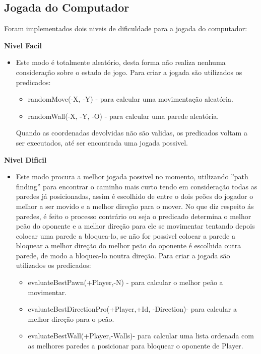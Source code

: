 \documentclass[a4paper]{article}
\begin{document}
\newpage
\subsection{Jogada do Computador} 

Foram implementados dois niveis de dificuldade para a jogada do computador:

\textbf{Nivel Facil}
\begin{itemize}
\item Este modo é totalmente aleatório, desta forma não realiza nenhuma consideração sobre o estado de jogo. Para criar a jogada são utilizados os predicados:
	\begin{itemize}
		\item randomMove(-X, -Y) - para calcular uma movimentação aleatória.
		\item randomWall(-X, -Y, -O) - para calcular uma parede aleatória.
	\end{itemize}
	 Quando as coordenadas devolvidas não são validas, os predicados voltam a ser executados, até ser encontrada uma jogada possivel.
\end{itemize}

\textbf{Nivel Dificil}
\begin{itemize}
\item Este modo procura a melhor jogada possivel no momento, utilizando ''path finding'' para encontrar o caminho mais curto tendo em consideração todas as paredes já posicionadas, assim é escolhido de entre o dois peões do jogador o melhor a ser movido e a melhor direção para o mover.
No que diz respeito ás paredes, é feito o processo contrário ou seja o predicado determina o melhor peão do oponente e a melhor direção para ele se movimentar tentando depois colocar uma parede a bloquea-lo, se não for possivel colocar a parede a bloquear a melhor direção do melhor peão do oponente é escolhida outra parede, de modo a bloquea-lo noutra direção.
 Para criar a jogada são utilizados os predicados:
 \begin{itemize}
		\item evaluateBestPawn(+Player,-N) - para calcular o melhor peão a movimentar.
		\item evaluateBestDirectionPro(+Player,+Id, -Direction)-  para calcular a melhor direção para o peão.
		\item evaluateBestWall(+Player,-Walls)- para calcular uma lista ordenada com as melhores paredes a posicionar para bloquear o oponente de Player.
	\end{itemize}
\end{itemize}
\end{document}
